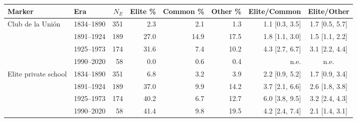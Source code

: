 \begin{tabular}{llrrrrrc}
\toprule
Marker & Era & $N_E$ & Elite \% & Common \% & Other \% & Elite/Common & Elite/Other \\
\midrule
Club de la Uni\'on & 1834--1890 & 351 & 2.3 & 2.1 & 1.3 & 1.1 [0.3, 3.5] & 1.7 [0.5, 5.7] \\
 & 1891--1924 & 189 & 27.0 & 14.9 & 17.5 & 1.8 [1.1, 3.0] & 1.5 [1.1, 2.2] \\
 & 1925--1973 & 174 & 31.6 & 7.4 & 10.2 & 4.3 [2.7, 6.7] & 3.1 [2.2, 4.4] \\
 & 1990--2020 & 58 & 0.0 & 0.6 & 0.4 & n.e. & n.e. \\
\midrule
Elite private school & 1834--1890 & 351 & 6.8 & 3.2 & 3.9 & 2.2 [0.9, 5.2] & 1.7 [0.9, 3.4] \\
 & 1891--1924 & 189 & 37.0 & 9.9 & 14.2 & 3.7 [2.1, 6.6] & 2.6 [1.8, 3.8] \\
 & 1925--1973 & 174 & 40.2 & 6.7 & 12.7 & 6.0 [3.8, 9.5] & 3.2 [2.4, 4.3] \\
 & 1990--2020 & 58 & 41.4 & 9.8 & 19.5 & 4.2 [2.4, 7.4] & 2.1 [1.4, 3.1] \\
\bottomrule
\end{tabular}
